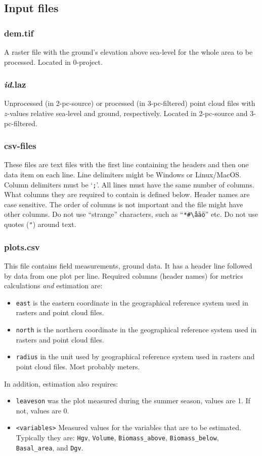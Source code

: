 \documentclass[english,a4paper,minion,nofigsidecaption]{article}
\newcommand{\file}[1]{\textsf{#1}}
\renewcommand{\tt}[1]{\texttt{#1}}
\newcommand{\id}{\emph{id}}
\begin{document}
\subsection{Input files}

\subsubsection{dem.tif}
A raster file with the ground's elevation above sea-level for the whole area to be processed. 
Located in \file{0-project}.

\subsubsection{{\id}.laz}
Unprocessed (in \file{2-pc-source}) or processed (in \file{3-pc-filtered}) point cloud files with $z$-values relative sea-level and ground, respectively. 
Located in \file{2-pc-source} and \file{3-pc-filtered}.


\subsubsection{csv-files}

These files are text files with the first line containing the headers and then one data item on each line. Line delimiters might be Windows or Linux/MacOS. Column delimiters must be ‘\texttt{;}’. All lines must have the same number of columns. What columns they are required to contain is defined below. Header names are case sensitive. The order of columns is not important and the file might have other columns. Do not use “strange” characters, such as “\verb|*#\åäö|” etc. Do not use quotes (\tt{"}) around text.

\subsubsection{plots.csv}
This file contains field measurements, ground data. It has a header line followed by data from one plot per line. Required columns (header names) for metrics calculations \emph{and} estimation are:
\begin{itemize}
	\item\tt{east} is the eastern coordinate in the geographical reference system used in rasters and point cloud files.
	\item\tt{north} is the northern coordinate in the geographical reference system used in rasters and point cloud files.
	\item\tt{radius} in the unit used by geographical reference system used in rasters and point cloud files. Most probably meters.
\end{itemize}
In addition, estimation also requires:
\begin{itemize}
	\item\tt{leaveson} was the plot measured during the summer season, values are 1. If not, values are 0.
	\item\tt{<variables>} Measured values for the variables that are to be estimated. Typically they are: \tt{Hgv}, \tt{Volume}, \verb|Biomass_above|, \verb|Biomass_below|, \verb|Basal_area|, and \tt{Dgv}.
\end{itemize}
\end{document}
